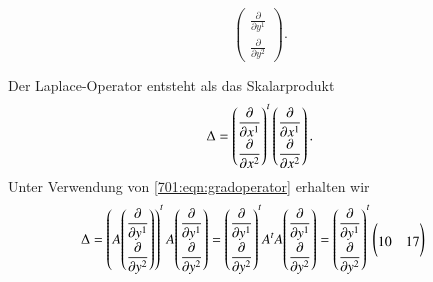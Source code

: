 \begin{loesung}
\begin{teilaufgaben}
\begin{equation}
\begin{pmatrix}
\displaystyle \frac{\partial }{\partial y^1}\\
\displaystyle \frac{\partial }{\partial y^2}
\end{pmatrix}.
\label{701:eqn:gradoperator}
\end{equation}
\item
Der Laplace-Operator entsteht als das Skalarprodukt
\[
\Delta
=
\renewcommand{\arraystretch}{1.8}
\begin{pmatrix}
\displaystyle \frac{\partial }{\partial x^1}\\
\displaystyle \frac{\partial }{\partial x^2}
\end{pmatrix}^t
\begin{pmatrix}
\displaystyle \frac{\partial }{\partial x^1}\\
\displaystyle \frac{\partial }{\partial x^2}
\end{pmatrix}.
\]
Unter Verwendung von \eqref{701:eqn:gradoperator} erhalten wir
\begin{align*}
\Delta
&=
\left( A
\bgroup
\renewcommand{\arraystretch}{1.8}
\begin{pmatrix}
\displaystyle \frac{\partial }{\partial y^1}\\
\displaystyle \frac{\partial }{\partial y^2}
\end{pmatrix}
\egroup
\right)^t
A
\bgroup
\renewcommand{\arraystretch}{1.8}
\begin{pmatrix}
\displaystyle \frac{\partial }{\partial y^1}\\
\displaystyle \frac{\partial }{\partial y^2}
\end{pmatrix}
\egroup
=
\bgroup
\renewcommand{\arraystretch}{1.8}
\begin{pmatrix}
\displaystyle \frac{\partial }{\partial y^1}\\
\displaystyle \frac{\partial }{\partial y^2}
\end{pmatrix}^t
\egroup
A^tA
\bgroup
\renewcommand{\arraystretch}{1.8}
\begin{pmatrix}
\displaystyle \frac{\partial }{\partial y^1}\\
\displaystyle \frac{\partial }{\partial y^2}
\end{pmatrix}
\egroup
=
\bgroup
\renewcommand{\arraystretch}{1.8}
\begin{pmatrix}
\displaystyle \frac{\partial }{\partial y^1}\\
\displaystyle \frac{\partial }{\partial y^2}
\end{pmatrix}^t
\egroup
\begin{pmatrix}
10&17\\

\end{pmatrix}
\end{align*}
\end{teilaufgaben}
\end{loesung}
